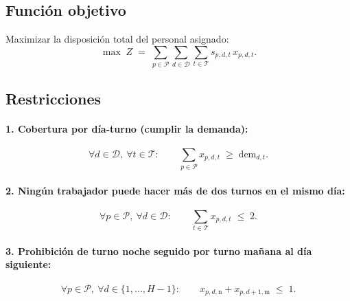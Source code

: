 \documentclass{article}
\begin{document}
\subsection*{Función objetivo}
Maximizar la disposición total del personal asignado:
\[
\max \; Z \;=\; \sum_{p\in\mathcal{P}}\sum_{d\in\mathcal{D}}\sum_{t\in\mathcal{T}} s_{p,d,t}\, x_{p,d,t}.
\]

\subsection*{Restricciones}

\paragraph{1. Cobertura por día-turno (cumplir la demanda):}
\[
\forall d\in\mathcal{D},\ \forall t\in\mathcal{T}:\qquad
\sum_{p\in\mathcal{P}} x_{p,d,t} \;\ge\; \text{dem}_{d,t}.
\tag{R1}
\]

\paragraph{2. Ningún trabajador puede hacer más de dos turnos en el mismo día:}
\[
\forall p\in\mathcal{P},\ \forall d\in\mathcal{D}:\qquad
\sum_{t\in\mathcal{T}} x_{p,d,t} \;\le\; 2.
\tag{R2}
\]

\paragraph{3. Prohibición de turno noche seguido por turno mañana al día siguiente:}
\[
\forall p\in\mathcal{P},\ \forall d\in\{1,\dots,H-1\}:\qquad
x_{p,d,\text{n}} + x_{p,d+1,\text{m}} \;\le\; 1.
\tag{R3}
\]

\end{document}
